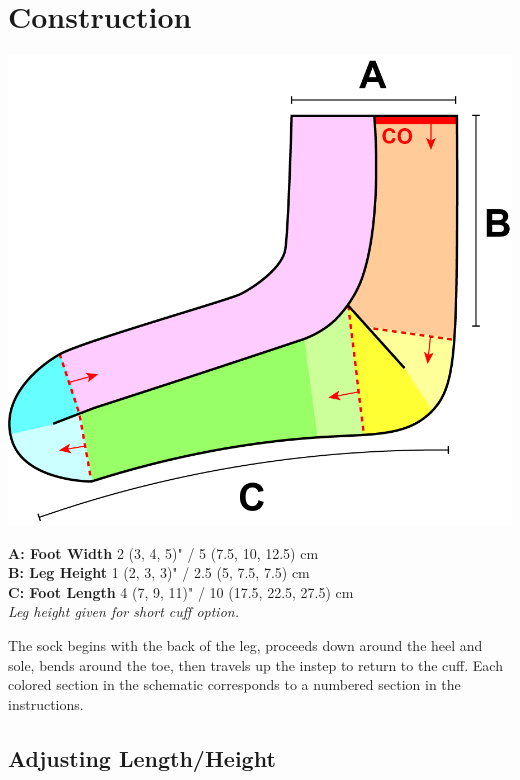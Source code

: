 \documentclass[12pt]{article}
\begin{document}
\section*{Construction}
\small \begin{multicols}{2}
\includegraphics[width=.9\linewidth]{BATA_schematic.png}
\columnbreak 
\begin{addmargin}[-2em]{0em}
{\normalsize\textbf{\textsf{A: Foot Width}}} \hspace{.5em} 2 (3, 4, 5)" / 5 (7.5, 10, 12.5) cm \\

{\normalsize\textbf{\textsf{B: Leg Height}}} \hspace{.5em} 1 (2, 3, 3)" / 2.5 (5, 7.5, 7.5) cm \\

{\normalsize\textbf{\textsf{C: Foot Length}}} \hspace{.5em} 4 (7, 9, 11)" / 10 (17.5, 22.5, 27.5) cm \\

\emph{Leg height given for short cuff option.}

The sock begins with the back of the leg, proceeds down around the heel and sole, bends around the toe, then travels up the instep to return to the cuff. Each colored section in the schematic corresponds to a numbered section in the instructions.
\end{addmargin}
\end{multicols}

\subsection*{Adjusting Length/Height}
\end{document}
